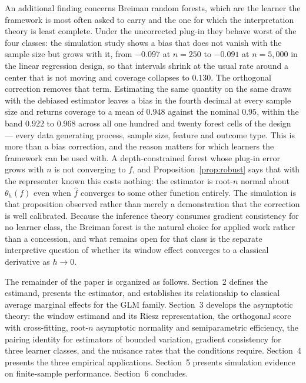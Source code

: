 \documentclass[12pt]{article}
\begin{document}
	An additional finding concerns Breiman random forests, which are the learner the
	framework is most often asked to carry and the one for which the interpretation
	theory is least complete. Under
	the uncorrected plug-in they behave worst of the four classes: the simulation
	study shows a bias that does not vanish with the sample size but grows with it,
	from $-0.097$ at $n=250$ to $-0.091$ at $n=5{,}000$ in the linear regression
	design, so that intervals shrink at the usual rate around a center that is not
	moving and coverage collapses to $0.130$. The orthogonal correction removes that
	term. Estimating the same quantity on the same draws with the debiased estimator
	leaves a bias in the fourth decimal at every sample size and returns coverage to a
	mean of $0.948$ against the nominal $0.95$, within the band $0.922$ to $0.968$
	across all one hundred and twenty forest cells of the design --- every data
	generating process, sample size, feature and outcome type.
	This is more than a bias correction, and the reason matters for which learners
	the framework can be used with. A depth-constrained forest whose plug-in error
	grows with $n$ is not converging to $f$, and Proposition~\ref{prop:robust} says
	that with the representer known this costs nothing: the estimator is root-$n$
	normal about $\theta_h(f)$ even when $\hat{f}$ converges to some other function
	entirely. The simulation is that proposition observed rather than merely a
	demonstration that the correction is well calibrated. Because the inference
	theory consumes gradient consistency for no learner class, the Breiman forest is
	the natural choice for applied work rather than a concession, and what remains
	open for that class is the separate interpretive question of whether its window
	effect converges to a classical derivative as $h \to 0$.
	
	The remainder of the paper is organized as follows. Section~2 defines the estimand, presents the estimator, and establishes its relationship to classical average marginal effects for the GLM family. Section~3 develops the asymptotic theory: the window estimand and its Riesz representation, the orthogonal score with cross-fitting, root-$n$ asymptotic normality and semiparametric efficiency, the pairing identity for estimators of bounded variation, gradient consistency for three learner classes, and the nuisance rates that the conditions require. Section~4 presents the three empirical applications. Section~5 presents simulation evidence on 	finite-sample performance. Section~6 concludes.
	
\end{document}

